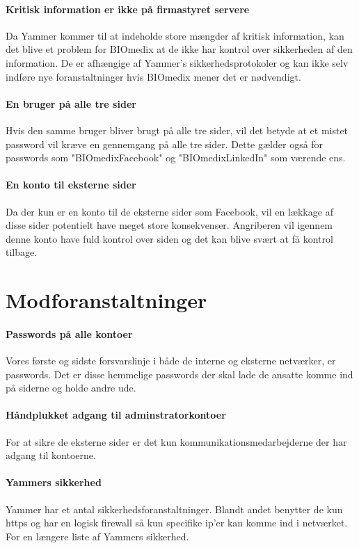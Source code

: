 \documentclass{article}
\begin{document}
\paragraph{Kritisk information er ikke på firmastyret servere}
Da Yammer kommer til at indeholde store mængder af kritisk information,
kan det blive et problem for BIOmedix at de ikke har kontrol over
sikkerheden af den information. De er afhængige af Yammer's 
sikkerhedsprotokoler og kan ikke selv indføre nye foranstaltninger hvis
BIOmedix mener det er nødvendigt.

\paragraph{En bruger på alle tre sider}
Hvis den samme bruger bliver brugt på alle tre sider, vil det betyde
at et mistet password vil kræve en gennemgang på alle tre sider. Dette
gælder også for passwords som "BIOmedixFacebook" og "BIOmedixLinkedIn" 
som værende ens.

\paragraph{En konto til eksterne sider}
Da der kun er en konto til de eksterne sider som Facebook, vil en
lækkage af disse sider potentielt have meget store konsekvenser.
Angriberen vil igennem denne konto have fuld kontrol over siden
og det kan blive svært at få kontrol tilbage.

\section{Modforanstaltninger}

\paragraph{Passwords på alle kontoer}
Vores første og sidste forsvarslinje i både de interne og eksterne
netværker, er passwords. Det er disse hemmelige passwords der skal
lade de ansatte komme ind på siderne og holde andre ude. 

\paragraph{Håndplukket adgang til adminstratorkontoer}
For at sikre de eksterne sider er det kun kommunikationsmedarbejderne der har 
adgang til kontoerne.

\paragraph{Yammers sikkerhed}
Yammer har et antal sikkerhedsforanstaltninger. Blandt andet benytter de
kun https og har en logisk firewall så kun specifike ip'er kan komme ind
i netværket. For en længere liste af Yammers sikkerhed\cite{YammerSec}. 
\end{document}
